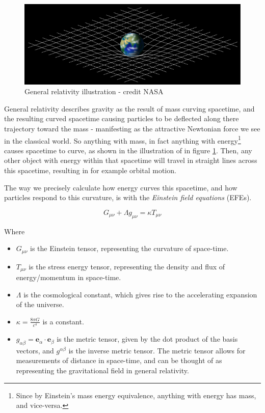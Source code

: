 \begin{figure}
    \centering
    \includegraphics[width=\textwidth]{preliminaries/preliminaries_images/640px-Spacetime_lattice_analogy.svg.png}
        \caption{General relativity illustration - credit NASA}
    \label{fig:GR_analogy}
\end{figure}

General relativity describes gravity as the result of mass curving spacetime, and the resulting curved spacetime causing particles to be deflected along there trajectory toward the mass - manifesting as the attractive Newtonian force we see in the classical world. So anything with mass, in fact anything with energy\footnote{Since by Einstein's mass energy equivalence, anything with energy has mass, and vice-versa.} causes spacetime to curve, as shown in the illustration of in figure \ref{fig:GR_analogy}. Then, any other object with energy within that spacetime will travel in straight lines across this spacetime, resulting in for example orbital motion. 

The way we precisely calculate how energy curves this spacetime, and how particles respond to this curvature, is with the \textit{Einstein field equations} (EFEs).

\begin{equation}
    G_{\mu \nu} + \Lambda g_{\mu \nu} = \kappa T_{\mu \nu}
\label{eq:EFE}
\end{equation}

Where 

\begin{itemize}
    \item $G_{\mu \nu}$ is the Einstein tensor, representing the curvature of space-time.
    
    \item $T_{\mu \nu}$ is the stress energy tensor, representing the density and flux of energy/momentum in space-time.
    
    \item $\Lambda$ is the cosmological constant, which gives rise to the accelerating expansion of the universe.
    
    \item $\kappa=\frac{8\pi G}{c^4}$ is a constant.
    
    \item $g_{\alpha \beta} = \boldsymbol{e}_\alpha \cdot \boldsymbol{e}_\beta$ is the metric tensor, given by the dot product of the basis vectors, and $g^{\alpha \beta}$ is the inverse metric tensor. The metric tensor allows for measurements of distance in space-time, and can be thought of as representing the gravitational field in general relativity.
 \end{itemize}


